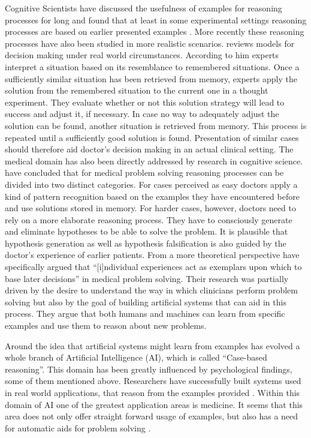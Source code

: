 Cognitive Scientists have discussed the usefulness of examples for reasoning processes for long and found that at least in some experimental settings reasoning processes are based on earlier presented examples \citep{Medin1978}. More recently these reasoning processes have also been studied in more realistic scenarios. \citet{Klein2008} reviews models for decision making under real world circumstances. According to him experts interpret a situation based on its resemblance to remembered situations. Once a sufficiently similar situation has been retrieved from memory, experts apply the solution from the remembered situation to the current one in a thought experiment. They evaluate whether or not this solution strategy will lead to success and adjust it, if necessary. In case no way to adequately adjust the solution can be found, another situation is retrieved from memory. This process is repeated until a sufficiently good solution is found. Presentation of similar cases should therefore aid doctor's decision making in an actual clinical setting. The medical domain has also been directly addressed by research in cognitive science. \citet{Elstein2002} have concluded that for medical problem solving reasoning processes can be divided into two distinct categories. For cases perceived as easy doctors apply a kind of pattern recognition based on the examples they have encountered before and use solutions stored in memory. For harder cases, however, doctors need to rely on a more elaborate reasoning process. They have to consciously generate and eliminate hypotheses to be able to solve the problem. It is plausible that hypothesis generation as well as hypothesis falsification is also guided by the doctor's experience of earlier patients. From a more theoretical perspective \citet{Kolodner1987} have specifically argued that ``[i]ndividual experiences act as exemplars upon which to base later decisions'' in medical problem solving. Their research was partially driven by the desire to understand the way in which clinicians perform problem solving but also by the goal of building artificial systems that can aid in this process. They argue that both humans and machines can learn from specific examples and use them to reason about new problems.

Around the idea that artificial systems might learn from examples has evolved a whole branch of Artificial Intelligence (AI), which is called ``Case-based reasoning''. This domain has been greatly influenced by psychological findings, some of them mentioned above. Researchers have successfully built systems used in real world applications, that reason from the examples provided  \citep{Aamodt1994}. Within this domain of AI one of the greatest application areas is medicine. It seems that this area does not only offer straight forward usage of examples, but also has a need for automatic aids for problem solving \citep{Begum2011}.

